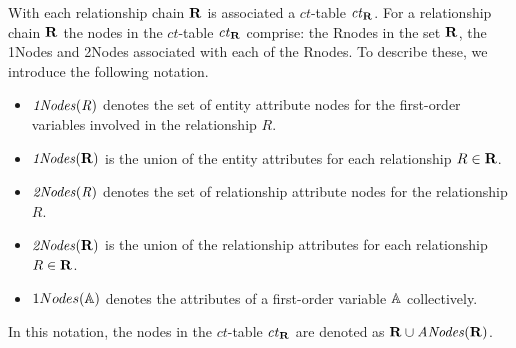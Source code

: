 \documentclass{vldb}
\newcommand{\ct}{\mathit{ct}}
\begin{document}
With each relationship chain $\mathbf{R}$ is associated a $\ct$-table $\ct_{\set{\Relation}}$. 
For a relationship chain $\mathbf{R}$ the nodes in the $\ct$-table  $\ct_{\set{\Relation}}$ %
 comprise: the Rnodes in the set $\mathbf{R}$, the 1Nodes and 2Nodes associated with each of the Rnodes. To describe these, we introduce the following notation.

\begin{itemize}
\item $\it{1Nodes}(R)$ denotes the set of entity attribute nodes for the first-order variables involved in the relationship $R$. 
\item $\it{1Nodes}(\mathbf{R})$ is the union of the entity attributes for each relationship $R \in \mathbf{R}$.
\item $\it{2Nodes}(R)$ denotes the set of relationship attribute nodes for %
the relationship $R$.
\item $\it{2Nodes}(\mathbf{R})$ is the union of the relationship attributes for each relationship $R \in \mathbf{R}$.
\item  $1Nodes(\mathbb{A})$ denotes the attributes of a first-order variable $\mathbb{A}$ collectively.
\end{itemize}

In this notation, the nodes in the $\ct$-table  $\ct_{\set{\Relation}}$  are denoted as $\mathbf{R} \cup \it{ANodes}({\mathbf{R}})$. 

\end{document}
